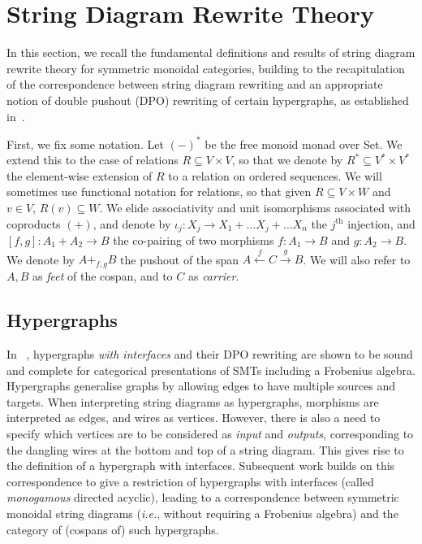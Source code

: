\section{String Diagram Rewrite Theory}\label{sec:combinatorial-semantics}

In this section,  we recall the fundamental definitions and results of string diagram rewrite theory for symmetric monoidal categories,  building to the recapitulation of the correspondence between string diagram rewriting and an appropriate notion of double pushout (DPO) rewriting of certain hypergraphs,  as established in~\cite{bonchi_string_2022-1, bonchi_string_2022-2}.  

First,  we fix some notation.  Let $(-)^*$ be the free monoid monad over \textsf{Set}.  
We extend this to the case of relations $R \subseteq V \times V$,  so that we denote by $R^{*} \subseteq V^* \times V^*$ the element-wise extension of $R$ to a relation on ordered sequences. 
We will sometimes use functional notation for relations,  so that given $R \subseteq V \times W$ and $v \in V$,  $R(v) \subseteq W$. 
We elide associativity and unit isomorphisms associated with coproducts $(+)$,  and denote by $\iota_j: X_{j} \rightarrow X_{1} + \ldots X_{j} + \ldots X_{n}$ the $j^{\text{th}}$ injection,  and $[f,g]: A_1 + A_2 \to B$ the co-pairing of two morphisms $f: A_1 \to B$ and $g:A_2 \to B$. 
We denote by $A +_{f,g} B$ the pushout of the span $A \xleftarrow{f} C \xrightarrow{g} B$.
We will also refer to $A,B$ as \textit{feet} of the cospan, and to $C$ as \textit{carrier}.

\subsection{Hypergraphs}

In ~\cite{bonchi_string_2022-1},  hypergraphs \textit{with interfaces} and their DPO rewriting are shown to be sound and complete for categorical presentations of SMTs including a Frobenius algebra. 
Hypergraphs generalise graphs by allowing edges to have multiple sources and targets. 
When interpreting string diagrams as hypergraphs,  morphisms are interpreted as edges,  and wires as vertices.  
However,  there is also a need to specify which vertices are to be considered as \textit{input} and \textit{outputs},  corresponding to the dangling wires at the bottom and top of a string diagram. 
This gives rise to the definition of a hypergraph with interfaces.  
Subsequent work \cite{bonchi_string_2022-2} builds on this correspondence to give a restriction of hypergraphs with interfaces (called \textit{monogamous} directed acyclic),  leading to a correspondence between symmetric monoidal string diagrams (\textit{i.e.}, without requiring a Frobenius algebra) and the category of (cospans of) such hypergraphs.


